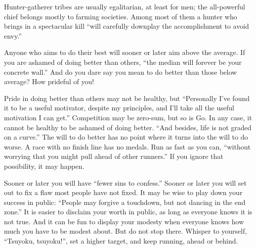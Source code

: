 
Hunter-gatherer tribes are usually egalitarian, at least for men; the all-powerful chief belongs mostly to farming societies. Among most of them a hunter who brings in a spectacular kill ``will carefully downplay the accomplishment to avoid envy.'' 

Anyone who aims to do their best will sooner or later aim above the average. If you are ashamed of doing better than others, ``the median will forever be your concrete wall.'' And do you dare say you mean to do better than those below average? How prideful of you! 

Pride in doing better than others may not be healthy, but ``Personally I've found it to be a useful motivator, despite my principles, and I'll take all the useful motivation I can get.'' Competition may be zero-sum, but so is Go. In any case, it cannot be healthy to be ashamed of doing better. ``And besides, life is not graded on a curve.'' The will to do better has no point where it turns into the will to do worse. A race with no finish line has no medals. Run as fast as you can, ``without worrying that you might pull ahead of other runners.'' If you ignore that possibility, it may happen. 

Sooner or later you will have ``fewer sins to confess.'' Sooner or later you will set out to fix a flaw most people have not fixed. It may be wise to play down your success in public: ``People may forgive a touchdown, but not dancing in the end zone.'' It is easier to disclaim your worth in public, as long as everyone knows it is not true. And it can be fun to display your modesty when everyone knows how much you have to be modest about. But do not stop there. Whisper to yourself, ``Tsuyoku, tsuyoku!'', set a higher target, and keep running, ahead or behind.
